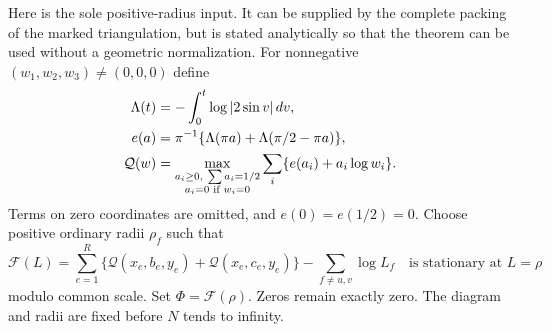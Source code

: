 \documentclass[11pt]{article}
\numberwithin{equation}{section}
\theoremstyle{definition}\newtheorem{definition}[theorem]{Definition}
\theoremstyle{remark}\newtheorem{remark}[theorem]{Remark}
\newcommand{\calQ}{\mathcal Q}
\begin{document}
Here is the sole positive-radius input. It can be supplied by the
complete packing of the marked triangulation, but is stated analytically
so that the theorem can be used without a geometric normalization.
For nonnegative $(w_1,w_2,w_3)\ne(0,0,0)$ define
\begin{align}
 \Lambda(t)&=-\int_0^t\log|2\sin v|\,dv,\notag\\
 e(a)&=\pi^{-1}\{\Lambda(\pi a)+\Lambda(\pi/2-\pi a)\},\notag\\
 \calQ(w)&=\max_{\substack{a_i\ge0,\ \sum a_i=1/2\\a_i=0\text{ if }w_i=0}}
             \sum_i\{e(a_i)+a_i\log w_i\}.\label{sa:entropy}
\end{align}
Terms on zero coordinates are omitted, and $e(0)=e(1/2)=0$.
Choose positive ordinary radii $\rho_f$ such that
\begin{equation}\label{sa:stationarity}
 \mathcal F(L)=\sum_{e=1}^R
     \{\calQ(x_e,b_e,y_e)+\calQ(x_e,c_e,y_e)\}
                         -\sum_{f\ne u,v}\log L_f
 \quad\text{is stationary at }L=\rho
\end{equation}
modulo common scale. Set $\Phi=\mathcal F(\rho)$.
Zeros remain exactly zero. The diagram and radii are fixed before $N$
tends to infinity.
\end{document}
